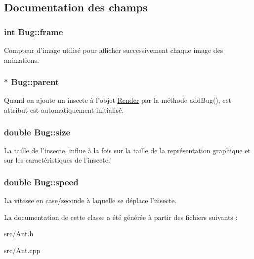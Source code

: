 \subsection{Documentation des champs}
\hypertarget{classBug_ad7e3597cf049f1051be94fcaf2fd3598}{
\subsubsection[{frame}]{\setlength{\rightskip}{0pt plus 5cm}int {\bf Bug::frame}}}
\label{classBug_ad7e3597cf049f1051be94fcaf2fd3598}
Compteur d'image utilisé pour afficher successivement chaque image des animations. \hypertarget{classBug_a7a93aae4e4b7a215c94ff85d0bd6e26d}{
\subsubsection[{parent}]{$\ast$ {\bf Bug::parent}}}
\label{classBug_a7a93aae4e4b7a215c94ff85d0bd6e26d}
Quand on ajoute un insecte à l'objet \hyperlink{classRender}{Render} par la méthode addBug(), cet attribut est automatiquement initialisé. \hypertarget{classBug_a27a0f0b84d15525e409955509e6e3c42}{
\subsubsection[{size}]{\setlength{\rightskip}{0pt plus 5cm}double {\bf Bug::size}}}
\label{classBug_a27a0f0b84d15525e409955509e6e3c42}
La taille de l'insecte, influe à la fois sur la taille de la représentation graphique et sur les caractéristiques de l'insecte.' \hypertarget{classBug_a13b95fbf23748ea853b01bfd0b0e7fc8}{
\subsubsection[{speed}]{\setlength{\rightskip}{0pt plus 5cm}double {\bf Bug::speed}}}
\label{classBug_a13b95fbf23748ea853b01bfd0b0e7fc8}
La vitesse en case/seconde à laquelle se déplace l'insecte. 

La documentation de cette classe a été générée à partir des fichiers suivants :\begin{DoxyCompactItemize}
\item 
src/Ant.h\item 
src/Ant.cpp\end{DoxyCompactItemize}
